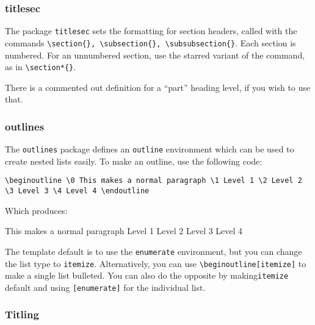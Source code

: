 \documentclass[12pt]{article}
\begin{document}
\subsubsection{titlesec}

    The package \texttt{titlesec} sets the formatting for section headers, called with the commands \texttt{\textbackslash section\{\}, \textbackslash subsection\{\}, \textbackslash subsubsection\{\}}. Each section is numbered. For an unnumbered section, use the starred variant of the command, as in \texttt{\textbackslash section*\{\}}.

    There is a commented out definition for a ``part'' heading level, if you wish to use that. 


\subsubsection{outlines}

    The \texttt{outlines} package defines an \texttt{outline} environment which can be used to create nested lists easily. To make an outline, use the following code:

    \texttt{\textbackslash begin{outline}
                \textbackslash 0 This makes a normal paragraph
                    \textbackslash 1 Level 1
                        \textbackslash 2 Level 2
                            \textbackslash 3 Level 3
                                \textbackslash 4 Level 4
            \textbackslash end{outline}
    }

    Which produces: 

        \begin{outline}
            \0 This makes a normal paragraph
                \1 Level 1
                    \2 Level 2
                        \3 Level 3
                            \4 Level 4
        \end{outline}



    The template default is to use the \texttt{enumerate} environment, but you can change the list type to \texttt{itemize}. Alternatively, you can use \texttt{\textbackslash begin{outline}[itemize]} to make a single list bulleted. You can also do the opposite by making\texttt{itemize} default and using \texttt{[enumerate]} for the individual list.

\subsubsection{Titling}
\end{document}
